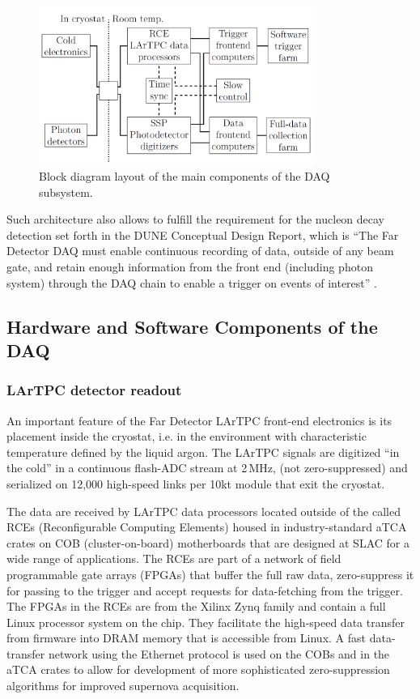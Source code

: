 \begin{figure}[h!]
	\centering
	\includegraphics[width=0.8\textwidth]{daq-block-diagram.png}
	\caption{Block diagram layout of the main components of the DAQ subsystem.}
	\label{fig:fddaqblock}
\end{figure}

\noindent
Such architecture also allows to fulfill the requirement for the nucleon decay detection set forth in the DUNE Conceptual Design Report,
which is ``The Far Detector DAQ must enable continuous recording of data, outside of any beam gate, and retain enough information from
the front end (including photon system) through the DAQ chain to enable a trigger on events of interest'' \cite{cdr_vol2}.

\subsection{Hardware and Software Components of the DAQ}
\subsubsection{LArTPC detector readout}
An important feature of the Far Detector LArTPC front-end electronics is its placement inside
the cryostat, i.e. in the environment  with characteristic temperature defined by the liquid argon.
The LArTPC signals are digitized ``in the cold'' in a continuous flash-ADC stream at 2\,MHz, (not zero-suppressed)
and serialized on 12,000 high-speed links per 10kt module that exit the cryostat.

The data are received by LArTPC data processors located outside of the called RCEs \cite{slac_rce_1} (Reconfigurable
Computing Elements) housed in industry-standard aTCA crates on COB (cluster-on-board)
motherboards that are designed at SLAC for a wide range of applications.  The RCEs are part of a
network of field programmable gate arrays (FPGAs) that buffer the full raw data,
zero-suppress it for passing to the trigger and accept requests for
data-fetching from the trigger.  The FPGAs in the RCEs are from the
Xilinx Zynq family and contain a full Linux processor system on the
chip.  They facilitate the high-speed data transfer from firmware into
DRAM memory that is accessible from Linux.  A fast data-transfer
network using the Ethernet protocol is used on the COBs and in the
aTCA crates to allow for development of more sophisticated zero-suppression algorithms
for improved supernova acquisition.

